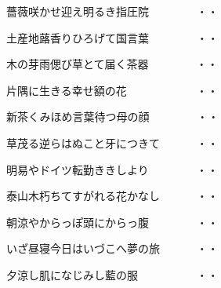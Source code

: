 \vspace{0.6cm}
\begin{shiika}薔薇咲かせ迎え明るき指圧院　　　　
\hfill{・・}\end{shiika}
\vspace{0.6cm}
\begin{shiika}土産地蕗香りひろげて国言葉　　　　
\hfill{・・}\end{shiika}
\vspace{0.6cm}
\begin{shiika}木の芽雨偲び草とて届く茶器　　　　
\hfill{・・}\end{shiika}
\vspace{0.6cm}
\begin{shiika}片隅に生きる幸せ額の花　　　　　　
\hfill{・・}\end{shiika}
\vspace{0.6cm}
\begin{shiika}新茶くみほめ言葉待つ母の顔　　　　
\hfill{・・}\end{shiika}
\vspace{0.6cm}
\begin{shiika}草茂る逆らはぬこと牙につきて　　　
\hfill{・・}\end{shiika}
\vspace{0.6cm}
\begin{shiika}明易やドイツ転勤ききしより　　　　
\hfill{・・}\end{shiika}
\vspace{0.6cm}
\begin{shiika}泰山木朽ちてすがれる花かなし　　　
\hfill{・・}\end{shiika}
\vspace{0.6cm}
\begin{shiika}朝涼やからっぽ頭にからっ腹　　　　
\hfill{・・}\end{shiika}
\vspace{0.6cm}
\begin{shiika}いざ昼寝今日はいづこへ夢の旅　　　
\hfill{・・}\end{shiika}
\vspace{0.6cm}
\begin{shiika}夕涼し肌になじみし藍の服　　　　　
\hfill{・・}\end{shiika}
